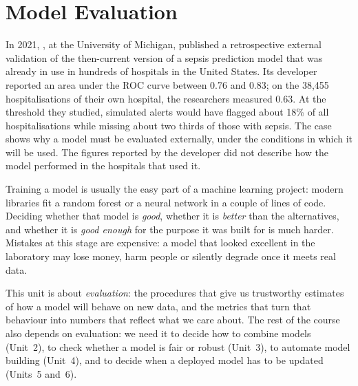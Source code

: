 \chapter{Model Evaluation}\label{ch:evaluation}

In 2021, \citet{wong2021external}, at the University of Michigan, published a retrospective external validation of the then-current
version of a sepsis prediction model that was already in use in hundreds of hospitals in the United States. Its
developer reported an area under the ROC curve between 0.76 and 0.83; on the 38,455 hospitalisations of their own
hospital, the researchers measured 0.63. At the threshold they studied, simulated alerts would have flagged about 18\%
of all hospitalisations while missing about two thirds of those with sepsis. The case shows
why a model must be evaluated externally, under the conditions in which it will be used. The figures reported by the developer did not
describe how the model performed in the hospitals that used it.

Training a model is usually the easy part of a machine learning project: modern libraries
fit a random forest or a neural network in a couple of lines of code. Deciding whether that
model is \emph{good}, whether it is \emph{better} than the alternatives, and whether it is
\emph{good enough} for the purpose it was built for is much harder. Mistakes at this stage
are expensive: a model that looked excellent in the laboratory may lose money, harm people
or silently degrade once it meets real data.

This unit is about \emph{evaluation}: the procedures that give us trustworthy estimates of
how a model will behave on new data, and the metrics that turn that behaviour into numbers
that reflect what we care about. The rest of the course also depends on evaluation:
we need it to decide how to combine models (Unit~2), to check whether a model is fair or
robust (Unit~3), to automate model building (Unit~4), and to decide when a deployed model
has to be updated (Units~5 and~6).

